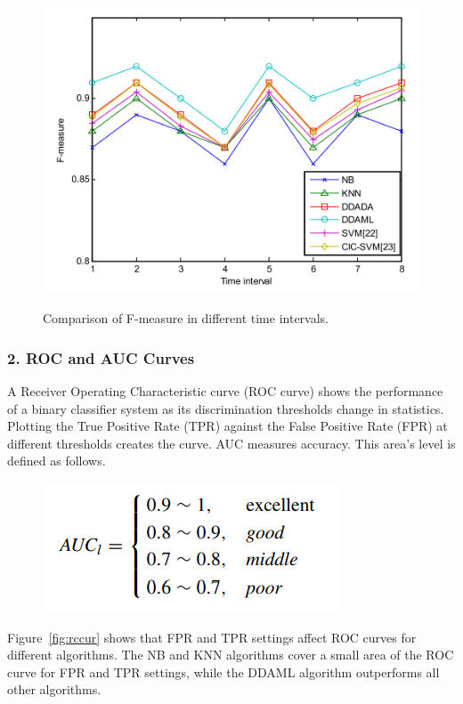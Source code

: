 \documentclass[12pt]{report}
\begin{document}
\begin{figure}[H]
    \centering
    \includegraphics[scale=0.4]{fig28.png}\\
    \caption{Comparison of F-measure in different time intervals.}
    \label{fig:time}
\end{figure}

\subsubsection{2. ROC and AUC Curves}
A Receiver Operating Characteristic curve (ROC curve) shows the performance of a binary classifier system as its discrimination thresholds change in statistics. Plotting the True Positive Rate (TPR) against the False Positive Rate (FPR) at different thresholds creates the curve. AUC measures accuracy. This area's level is defined as follows.

\begin{figure}[H]
    \centering
    \includegraphics[scale=0.5]{fig29.png}
\end{figure}

Figure~\ref{fig:rccur} shows that FPR and TPR settings affect ROC curves for different algorithms. The NB and KNN algorithms cover a small area of the ROC curve for FPR and TPR settings, while the DDAML algorithm outperforms all other algorithms. 
\end{document}

